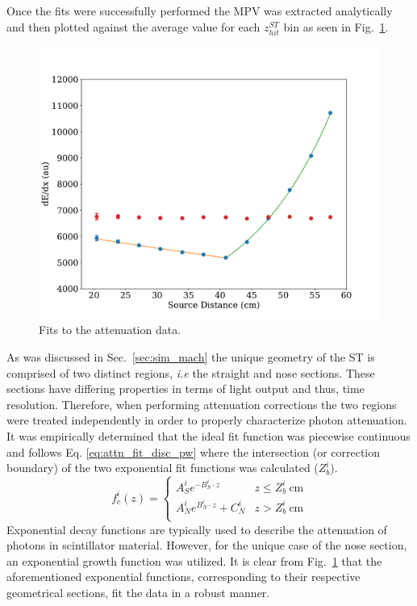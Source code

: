 Once the fits were successfully performed the MPV was extracted analytically and then plotted against the average value for each $z^{ST}_{hit}$ bin as seen in Fig.~\ref{fig:attfits}.
\begin{figure}[!htb]
	\centering
	\includegraphics[width=1.0\columnwidth]{calibration/figs/Att_fit_Paddle19.pdf}
	\caption{Fits to the attenuation data.}
	\label{fig:attfits}
\end{figure}


As was discussed in Sec.~\ref{sec:sim_mach} the unique geometry of the ST is comprised of two distinct regions, \textit{i.e} the straight and nose sections.  These sections have differing properties in terms of light output and thus, time resolution.  Therefore, when performing attenuation corrections the two regions were treated independently in order to properly characterize photon attenuation.  It was empirically determined that the ideal fit function was piecewise continuous and follows Eq. \ref{eq:attn_fit_disc_pw} where the intersection (or correction boundary) of the two exponential fit functions was calculated ($Z^{i}_{b}$).
	\begin{equation} \label{eq:attn_fit_disc_pw}
	f_{c}^{i}(z) = 
	\begin{cases} 
		A^{i}_{S}e^{-B^{i}_{S} \cdot z} & z \leq Z^{i}_{b}\ \mathrm{cm} \\
		A^{i}_{N}e^{B^{i}_{N} \cdot z} + C^{i}_{N} & z > Z^{i}_{b}\ \mathrm{cm} \\
	\end{cases}
	\end{equation}
Exponential decay functions are typically used to describe the attenuation of photons in scintillator material.  However, for the unique case of the nose section, an exponential growth function was utilized.  It is clear from Fig.~\ref{fig:attfits} that the aforementioned exponential functions, corresponding to their respective geometrical sections, fit the data in a robust manner.

